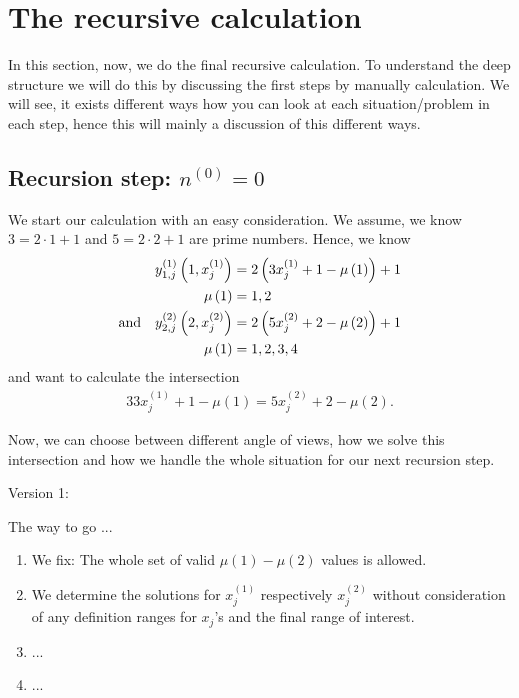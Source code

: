 \chapter{The recursive calculation}
\label{ch:therecursivecalculation}
\minitoc
In this section, now, we do the final recursive calculation. To understand the deep structure we will do this by discussing the first steps by manually calculation. We will see, it exists different ways how you can look at each situation/problem in each step, hence this will mainly a discussion of this different ways.
\section{Recursion step: $n^{\left(0\right)} = 0$}
\label{s:recursionstepn0_0}
We start our calculation with an easy consideration. We assume, we know $3=2\cdot 1 + 1$ and $5=2\cdot2 + 1$ are prime numbers. Hence, we know
\begin{alignat}{3}
	y_{1,j}^{\left(1\right)}\left(1,x_{j}^{\left(1\right)}\right) &= 2\left(3x_{j}^{\left(1\right)} + 1 - \mu\left(1\right)\right) + 1 \notag \\
	\mu\left(1\right) &= 1, 2 \label{eq:eqsn0_0_1} \\
	\mathrm{and} \quad y_{2,j}^{\left(2\right)}\left(2,x_{j}^{\left(2\right)}\right) &= 2\left(5x_{j}^{\left(2\right)} + 2 - \mu\left(2\right)\right) + 1 \notag \\
	\mu\left(1\right) &= 1,2,3,4 \label{eq:eqsn0_0_2}
\end{alignat}
and want to calculate the intersection
\begin{alignat}{3}
	3x_{j}^{\left(1\right)} + 1 - \mu\left(1\right) = 5x_{j}^{\left(2\right)} + 2 - \mu\left(2\right).
\label{eq:intn0_0}
\end{alignat}

Now, we can choose between different angle of views, how we solve this intersection and how we handle the whole situation for our next recursion step.

\vspace{0.3cm}
Version 1:

The way to go ...
\begin{enumerate}
	\item We fix: The whole set of valid $\mu\left(1\right) - \mu\left(2\right)$ values is allowed.
	\item We determine the solutions for $x_{j}^{\left(1\right)}$ respectively $x_{j}^{\left(2\right)}$ without consideration of any definition ranges for $x_{j}$'s and the final range of interest.
	\item ...
	\item ...
\label{en:n0_0_v1way}
\end{enumerate}

